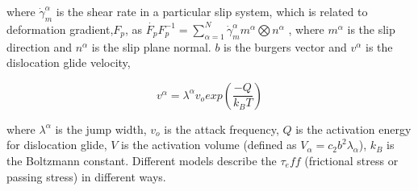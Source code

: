 \documentclass[a4paper,11pt]{article}
\begin{document}
where \begin{math} \dot{\gamma}_m^\alpha \end{math} is the shear rate in a particular slip system, which is related to deformation gradient,\begin{math} F_p \end{math}, as \begin{math} \dot{F_p} F_p^{-1} = \sum\limits_{\alpha = 1}^N \dot{\gamma}_m^\alpha m^\alpha \bigotimes n^\alpha \end{math}
, where \begin{math} m^\alpha \end{math} is the slip direction and \begin{math} n^\alpha \end{math} is the slip plane normal. \begin{math} b \end{math} is the burgers vector and \begin{math} v^\alpha \end{math} is the dislocation glide velocity,

\begin{equation} 
v^\alpha = \lambda^\alpha v_o exp\left(\frac{-Q}{{k_B}T}\right) \label{eq:2}
\end{equation}

where \begin{math} \lambda^\alpha \end{math} is the jump width, \begin{math} v_o \end{math} is the attack frequency, \begin{math} Q \end{math} is the activation energy for dislocation glide, 
\begin{math} V \end{math} is the activation volume (defined as  \begin{math} V_\alpha = c_2 b^2 \lambda_\alpha \end{math}), \begin{math} k_B \end{math} is the Boltzmann constant. Different models describe the
\begin{math} \tau_eff \end{math} (frictional stress or passing stress) in different ways. 
\end{document}

